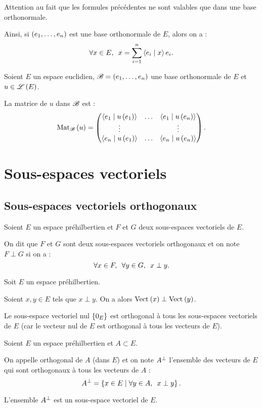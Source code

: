 \begin{rem}
Attention au fait que les formules précédentes ne sont valables que dans une base orthonormale.

Ainsi, si \(\left(e_1,\dots,e_n\right)\) est une base orthonormale de \(E\), alors on a : \[\quantifs{\forall x\in E}x=\sum_{i=1}^{n}\ps{e_i}{x}e_i.\]
\end{rem}

\begin{cor}
Soient \(E\) un espace euclidien, \(\mathscr{B}=\left(e_1,\dots,e_n\right)\) une base orthonormale de \(E\) et \(u\in\mathscr{L}\left(E\right)\).

La matrice de \(u\) dans \(\mathscr{B}\) est : \[\Mat{u}=\begin{pmatrix}
\ps{e_1}{u\paren{e_1}} & \dots & \ps{e_1}{u\paren{e_n}} \\
\vdots &  & \vdots \\
\ps{e_n}{u\paren{e_1}} & \dots & \ps{e_n}{u\paren{e_n}}
\end{pmatrix}.\]
\end{cor}

\section{Sous-espaces vectoriels}

\subsection{Sous-espaces vectoriels orthogonaux}

\begin{defi}
Soient \(E\) un espace préhilbertien et \(F\) et \(G\) deux sous-espaces vectoriels de \(E\).

On dit que \(F\) et \(G\) sont deux sous-espaces vectoriels orthogonaux et on note \(F\perp G\) si on a : \[\quantifs{\forall x\in F;\forall y\in G}x\perp y.\]
\end{defi}

\begin{ex}
Soit \(E\) un espace préhilbertien.

Soient \(x,y\in E\) tels que \(x\perp y\). On a alors \(\Vect{x}\perp\Vect{y}\).

Le sous-espace vectoriel nul \(\left\lbrace0_E\right\rbrace\) est orthogonal à tous les sous-espaces vectoriels de \(E\) (car le vecteur nul de \(E\) est orthogonal à tous les vecteurs de \(E\)).
\end{ex}

\begin{defi}
Soient \(E\) un espace préhilbertien et \(A\subset E\).

On appelle orthogonal de \(A\) (dans \(E\)) et on note \(A^{\perp}\) l'ensemble des vecteurs de \(E\) qui sont orthogonaux à tous les vecteurs de \(A\) : \[A\ortho=\accol{x\in E\tq\quantifs{\forall y\in A}x\perp y}.\]

L'ensemble \(A^{\perp}\) est un sous-espace vectoriel de \(E\).
\end{defi}

